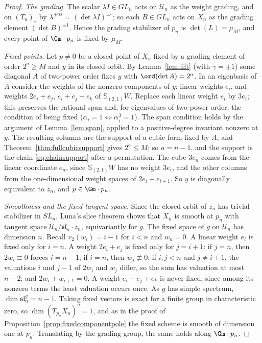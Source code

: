 \begin{proof}
\emph{The grading.} The scalar $\lambda I\in GL_n$ acts on $\mathcal U_n$ as the
weight grading, and on $(T_n)_s$ by $\lambda^{\pm ns}=(\det\lambda I)^{\pm s}$;
so each $B\in GL_n$ acts on $X_n$ as the grading element $(\det B)^{\pm1}$.
Hence the grading stabilizer of $p_n$ is $\det(L)=\mu_M$, and every point of
$\Gm\cdot p_n$ is fixed by $\mu_M$.

\emph{Fixed points.} Let $p\ne0$ be a closed point of $X_n$ fixed by a grading
element of order $2^a\ge M$ and $y$ in its closed orbit. By
Lemma~\ref{lem:lift} (with $\gamma=\pm1$) some diagonal $A$ of two-power order
fixes $y$ with $\ord(\det A)=2^a$. In an eigenbasis of $A$ consider the weights
of the nonzero components of $y$: linear weights $e_i$, and weights $2e_i+e_j$,
$e_i+e_j+e_k$ of $\mathbb S_{(2,1)}W$. Replace each linear weight $e_i$ by
$3e_i$; this preserves the rational span and, for eigenvalues of two-power
order, the condition of being fixed ($\alpha_i=1\iff\alpha_i^3=1$). The span
condition holds by the argument of Lemma~\ref{lem:span}, applied to a
positive-degree invariant nonzero at $y$. The resulting columns are the support
of a cubic form fixed by $A$, and Theorem~\ref{thm:fullcubicsupport} gives
$2^a\le M$; so $a=n-1$, and the support is the chain \eqref{eq:chainsupport}
after a permutation. The cube $3e_n$ comes from the linear coordinate $e_n$,
since $\mathbb S_{(2,1)}W$ has no weight $3e_i$, and the other columns from the
one-dimensional weight spaces of $2e_i+e_{i+1}$. So $y$ is diagonally
equivalent to $z_n$, and $p\in\Gm\cdot p_n$.

\emph{Smoothness and the fixed tangent space.} Since the closed orbit of $z_n$
has trivial stabilizer in $SL_n$, Luna's slice theorem
\cite[Section III.1, Th\'eor\`eme du slice \'etale and Remarque 1$^\circ$, pp.~97--98]{Luna} shows that $X_n$ is smooth at $p_n$ with
tangent space $\mathcal U_n/\mathfrak{sl}_n\cdot z_n$, equivariantly for $g$.
The fixed space of $g$ on $\mathcal U_n$ has dimension $n$. Recall
$v_2(w_i)=i-1$ for $i<n$ and $w_n=0$. A linear weight $e_i$ is fixed only for
$i=n$. A weight $2e_i+e_j$ is fixed only for $j=i+1$: if $j=n$, then
$2w_i\equiv0$ forces $i=n-1$; if $i=n$, then $w_j\not\equiv0$; if $i,j<n$ and
$j\ne i+1$, the valuations $i$ and $j-1$ of $2w_i$ and $w_j$ differ, so the sum
has valuation at most $n-2$; and $2w_i+w_{i+1}=0$. A weight $e_i+e_j+e_k$ is
never fixed, since among its nonzero terms the least valuation occurs once.
As $g$
has simple spectrum, $\dim\mathfrak{sl}_n^g=n-1$. Taking fixed vectors is exact
for a finite group in characteristic zero, so $\dim(T_{p_n}X_n)^g=1$, and as in
the proof of Proposition~\ref{prop:fixedcomponentpole} the fixed scheme is
smooth of dimension one at $p_n$. Translating by the grading group, the same
holds along $\Gm\cdot p_n$.


\end{proof}
